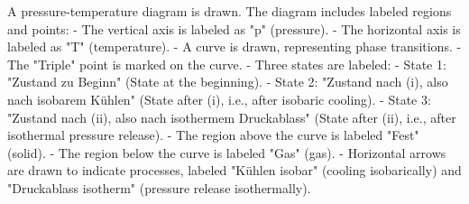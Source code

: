 A pressure-temperature diagram is drawn. The diagram includes labeled regions and points:  
- The vertical axis is labeled as "p" (pressure).  
- The horizontal axis is labeled as "T" (temperature).  
- A curve is drawn, representing phase transitions.  
- The "Triple" point is marked on the curve.  
- Three states are labeled:  
  - State 1: "Zustand zu Beginn" (State at the beginning).  
  - State 2: "Zustand nach (i), also nach isobarem Kühlen" (State after (i), i.e., after isobaric cooling).  
  - State 3: "Zustand nach (ii), also nach isothermem Druckablass" (State after (ii), i.e., after isothermal pressure release).  
- The region above the curve is labeled "Fest" (solid).  
- The region below the curve is labeled "Gas" (gas).  
- Horizontal arrows are drawn to indicate processes, labeled "Kühlen isobar" (cooling isobarically) and "Druckablass isotherm" (pressure release isothermally).